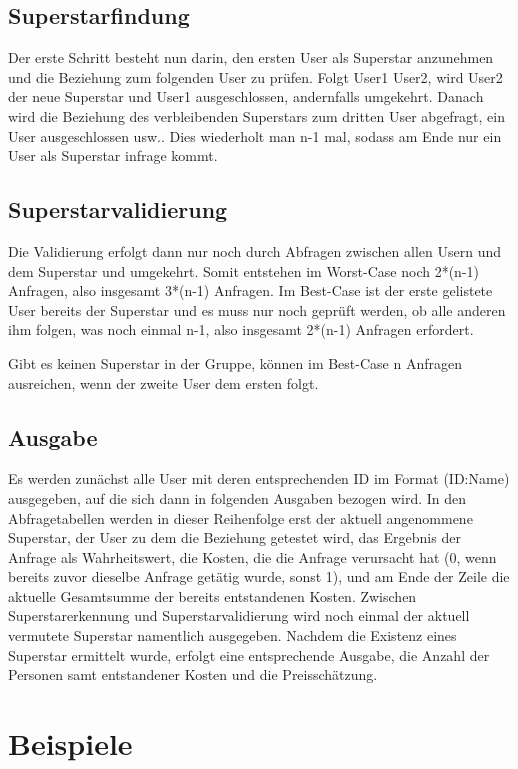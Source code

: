 \documentclass[a4paper,10pt,ngerman]{scrartcl}
\begin{document}
\subsection{Superstarfindung}
Der erste Schritt besteht nun darin, den ersten User als Superstar anzunehmen und die Beziehung zum folgenden User zu prüfen. Folgt User1 User2, wird User2 der neue Superstar und User1 ausgeschlossen, andernfalls umgekehrt. Danach wird die Beziehung des verbleibenden Superstars zum dritten User abgefragt, ein User ausgeschlossen usw.. Dies wiederholt man n-1 mal, sodass am Ende nur ein User als Superstar infrage kommt.

\subsection{Superstarvalidierung}
Die Validierung erfolgt dann nur noch durch Abfragen zwischen allen Usern und dem Superstar und umgekehrt. Somit entstehen im Worst-Case noch 2*(n-1) Anfragen, also insgesamt 3*(n-1) Anfragen. Im Best-Case ist der erste gelistete User bereits der Superstar und es muss nur noch geprüft werden, ob alle anderen ihm folgen, was noch einmal n-1, also insgesamt 2*(n-1) Anfragen erfordert.

Gibt es keinen Superstar in der Gruppe, können im Best-Case n Anfragen ausreichen, wenn der zweite User dem ersten folgt.

\subsection{Ausgabe}
Es werden zunächst alle User mit deren entsprechenden ID im Format (ID:Name) ausgegeben, auf die sich dann in folgenden Ausgaben bezogen wird. In den Abfragetabellen werden in dieser Reihenfolge erst der aktuell angenommene Superstar, der User zu dem die Beziehung getestet wird, das Ergebnis der Anfrage als Wahrheitswert, die Kosten, die die Anfrage verursacht hat (0, wenn bereits zuvor dieselbe Anfrage getätig wurde, sonst 1), und am Ende der Zeile die aktuelle Gesamtsumme der bereits entstandenen Kosten.
Zwischen Superstarerkennung und Superstarvalidierung wird noch einmal der aktuell vermutete Superstar namentlich ausgegeben.
Nachdem die Existenz eines Superstar ermittelt wurde, erfolgt eine entsprechende Ausgabe, die Anzahl der Personen samt entstandener Kosten und die Preisschätzung.

\pagebreak
\section{Beispiele}
\end{document}
